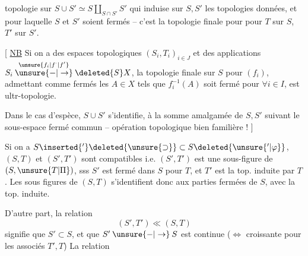 topologie sur $S\cup S'\simeq S\amalg_{S\cap S'}S'$ qui  induise sur $S,S'$ les topologies données, et pour laquelle $S$ et $S'$ soient fermés -- c'est la topologie finale pour
pour $T$ sur $S$, $T'$ sur $S'$.

[ \uline{NB} Si on a des espaces topologiques $(S_i,T_i)_{i\in J}$ et des applications $S_i\overset{\unsure{f_i|f^{\cdot}|f'}}{\mathbin{\unsure{-|\to}}}\deleted{S}X$, la topologie finale sur $S$ pour $(f_i)$, admettant comme fermés les $A\in X$ tels que $f_i^{-1}(A)$ soit fermé pour $\forall i\in I$, est  ultr-topologie.


Dans le cas d'espèce, $S\cup S'$ s'identifie, à la somme amalgamée de $S,S'$ suivant le sous-espace fermé commun -- opération topologique bien familière ! ]

Si on a $S\inserted{'}\deleted{\unsure{\supset}}\subset S\deleted{\unsure{'|\varphi}}$, $(S,T)$ et $(S',T')$ sont compatibles i.e. $(S',T')$ est une sous-figure de $(S,\unsure{T|\Pi})$, sss $S'$ est fermé dans $S$ pour $T$, et $T'$ est la top. induite par $T$. Les sous figures de $(S,T)$ s'identifient donc aux parties fermées de $S$, avec la top. induite.

D'autre part, la relation
\[
 (S',T')\ll(S,T)
\]
signifie que $S'\subset S$, et que $S'\mathbin{\unsure{-|\to}}S$ est continue ($\Longleftrightarrow$ croissante pour les  associés  $T',T$) La relation
